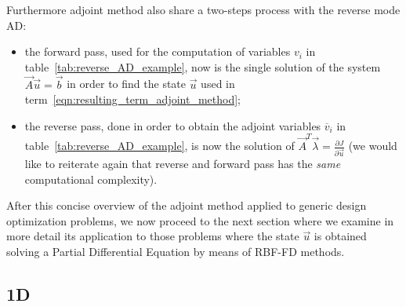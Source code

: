 Furthermore adjoint method also share a two-steps process with the reverse mode AD:
\begin{itemize}
	\item the forward pass, used for the computation of variables $v_i$ in table~\vref{tab:reverse_AD_example}, now is the single solution of the system $\vec{A}\vec{u}=\vec{b}$ in order to find the state $\vec{u}$ used in term~\eqref{eqn:resulting_term_adjoint_method};
	\item the reverse pass, done in order to obtain the adjoint variables $\overline{v}_i$ in table~\ref{tab:reverse_AD_example}, is now the solution of $\vec{A}^T \vec{\lambda} = \frac{\partial J}{\partial \vec{u}}$ (we would like to reiterate again that reverse and forward pass has the \emph{same} computational complexity). 
\end{itemize}

After this concise overview of the adjoint method applied to generic design optimization problems, we now proceed to the next section where we examine in more detail its application to those problems where the state $\vec{u}$ is obtained solving a Partial Differential Equation by means of RBF-FD methods.

\subsection{1D}
\label{subsec:adjoint_method_RBF-FD_1D}

